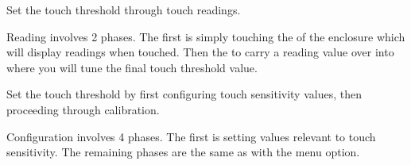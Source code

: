 
 \par\medskip

Set the touch threshold through touch readings.

\par\medskip

Reading involves \num{2} phases.  The first is simply touching the  of
the enclosure which will display readings when touched. Then  the 
to carry a reading value over into  where you will tune the final touch
threshold value.


 \par\medskip

Set the touch threshold by first configuring touch sensitivity values, then
proceeding through calibration.

\par\medskip

Configuration involves \num{4} phases.  The first is setting values relevant to
touch sensitivity.  The remaining phases are the same as with the  menu
option.


